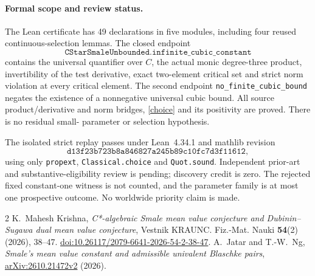 \documentclass[11pt]{article}
\begin{document}
\paragraph{Formal scope and review status.}
The Lean certificate has 49 declarations in five modules, including four
reused continuous-selection lemmas. The closed endpoint
\[
\texttt{CStarSmaleUnbounded.infinite\_cubic\_constant}
\]
contains the universal quantifier over $C$, the actual monic degree-three
product, invertibility of the test derivative, exact two-element critical
set and strict norm violation at every critical element. The second endpoint
\texttt{no\_finite\_cubic\_bound} negates the existence of a nonnegative
universal cubic bound. All source product/derivative and norm bridges,
\eqref{choice} and its positivity are proved. There is no residual small-
parameter or selection hypothesis.

The isolated strict replay passes under Lean~4.34.1 and mathlib revision
\[\texttt{d13f23b723b8a846827a245b89c10fc7d3f11612},\]
using only \texttt{propext}, \texttt{Classical.choice} and \texttt{Quot.sound}.
Independent prior-art and substantive-eligibility review is pending;
discovery credit is zero. The rejected fixed constant-one witness is not
counted, and the parameter family is at most one prospective outcome.
No worldwide priority claim is made.

\begin{thebibliography}{2}
 K.~Mahesh Krishna,
\emph{C*-algebraic Smale mean value conjecture and Dubinin--Sugawa dual mean
value conjecture}, Vestnik KRAUNC. Fiz.-Mat. Nauki \textbf{54}(2) (2026), 38--47.
\href{https://doi.org/10.26117/2079-6641-2026-54-2-38-47}{doi:10.26117/2079-6641-2026-54-2-38-47}.
 A.~Jatar and T.-W.~Ng,
\emph{Smale's mean value constant and admissible univalent Blaschke pairs},
\href{https://arxiv.org/abs/2610.21472v2}{arXiv:2610.21472v2} (2026).
\end{thebibliography}
\end{document}
